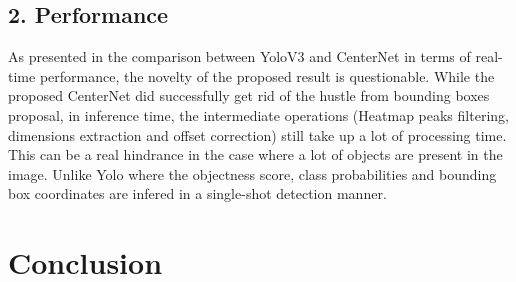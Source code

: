 \documentclass[12pt]{article}
\begin{document}
\subsection*{2. Performance}
As presented in the comparison between YoloV3 and CenterNet in terms of real-time performance, the novelty of the proposed result is questionable. While the proposed CenterNet did successfully get rid of the hustle from bounding boxes proposal, in inference time, the intermediate operations (Heatmap peaks filtering, dimensions extraction and offset correction) still take up a lot of processing time. This can be a real hindrance in the case where a lot of objects are present in the image. Unlike Yolo where the objectness score, class probabilities and bounding box coordinates are infered in a single-shot detection manner.

\section*{Conclusion}


 

\end{document}
